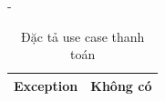 \begin {list} {-}{}
\begin{itemize}
\begin{table}[H]
\begin{tabular}{|l|l|}
                \textbf{Exception}        & Không có                                                                                                                                                                                                                                                                                                                                                                                                                                                                                                                                                                                                                                                                                                                                                                                                                                   \\ \hline
                \end{tabular}
                \begin{center}
                \end{center}
                \caption{Đặc tả use case thanh toán}
                \label{table:payment}
                \end{table}
                

\end{itemize}
\end{list}
